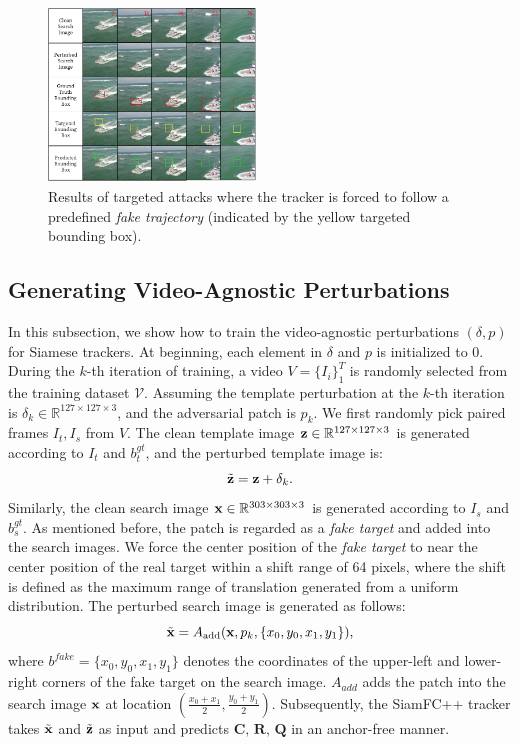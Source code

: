\documentclass[journal]{IEEEtran}
\begin{document}
\begin{figure}[t]
  \centering
  \includegraphics[width=0.49\textwidth]{images_imperceptible/vis_v7.pdf}
  \caption{Results of targeted attacks where the tracker is forced to follow a predefined \textit{fake trajectory} (indicated by the yellow targeted bounding box).}
  \label{fig:vis1}
\end{figure}

\subsection{Generating Video-Agnostic Perturbations}\label{generate}

In this subsection, we show how to train the video-agnostic perturbations $(\delta, p)$ for Siamese trackers. At beginning, each element in $\delta$ and $p$ is initialized to 0.
During the $k$-th iteration of training, a video $V=\{I_i\}_1^T$ is randomly selected from the training dataset $\mathcal V$. 
Assuming the template perturbation at the $k$-th iteration is $\delta_k \in \mathbb{R}^{127\times 127 \times 3}$, and the adversarial patch is $p_k$. 
We first randomly pick paired frames $I_t, I_s$ from $V$. The clean template image $\textbf z\in \mathbb{R}^{127\times 127 \times 3}$ is generated according to $I_t$ and $b^{gt}_t$, and the perturbed template image is:
\begin{equation}
\tilde {\textbf z} = \textbf z + \delta_k.
\end{equation}
Similarly, the clean search image $\textbf x \in \mathbb{R}^{303\times 303 \times 3}$ is generated according to $I_s$ and $b^{gt}_s$.
As mentioned before, the patch is regarded as a \textit{fake target} and added into the search images. We force the center position of the \textit{fake target} to near the center position of the real target within a shift range of 64 pixels, where the shift is defined as the maximum range of translation generated from a uniform distribution.
The perturbed search image is generated as follows:
\begin{equation}
\tilde{\textbf x} = A_{\text{add}}(\textbf x, p_k, \{x_0, y_0, x_1, y_1\}),
\end{equation}
where $ b^{fake} = \{x_0, y_0, x_1, y_1\}$ denotes the coordinates of the upper-left and lower-right corners of the fake target on the search image. 
\uline{$A_{add}$} adds the patch into the search image $\textbf x$ at location $(\frac{x_0+x_1}{2},\frac{y_0+y_1}{2})$. Subsequently, the SiamFC++ tracker takes $\tilde {\textbf x}$ and $\tilde{\textbf z}$ as input and predicts $\textbf{C, R, Q}$ in an anchor-free manner.
\end{document}
